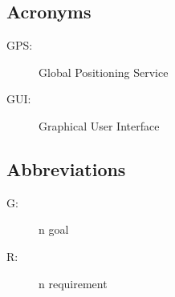 \documentclass[../../DD.tex]{subfiles}
\begin{document}
		\subsection{Acronyms}
		\begin{description}
		\item[GPS:]Global Positioning Service
		\item[GUI:]Graphical User Interface 
		\end{description}
		\subsection{Abbreviations}
		\begin{description}
			 \item[G:]n goal
			 \item[R:]n requirement
			
		\end{description}
		
\end{document}
